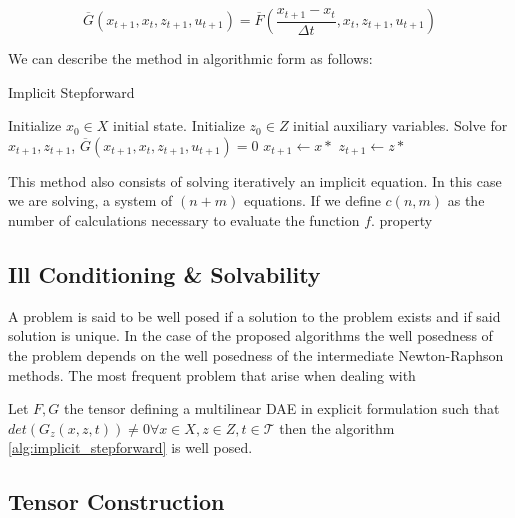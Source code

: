 \documentclass{article}
\newenvironment{remark}
\newenvironment{property}
\begin{document}
\begin{equation}
    \overline{G}(x_{t+1}, x_{t}, z_{t+1}, u_{t+1}) =  \overline{F}(\frac{x_{t+1}- x_t}{\Delta t}, x_{t}, z_{t+1}, u_{t+1})
\end{equation}

We can describe the method in algorithmic form as follows:

\begin{algorithm}
    \caption{Implicit Stepforward}
    \label{alg:implicit_stepforward}
    \begin{algorithmic}[1] %
        \State Initialize {$x_0 \in X$} initial state.
        \State Initialize {$z_0 \in Z$} initial auxiliary variables.
            \State Solve for $x_{t+1}, z_{t+1}$,  $\overline{G}(x_{t+1}, x_{t}, z_{t+1}, u_{t+1}) = 0$
            \State $x_{t+1} \gets x*$ 
            \State $z_{t+1} \gets z*$
        \EndFor
    \end{algorithmic}
\end{algorithm}

\begin{remark}
    This method also consists of solving iteratively an implicit equation. 
    In this case we are solving, a system of $(n+m)$ equations. If we define $c(n,m)$
    as the number of calculations necessary to evaluate the function $f$.    
\end{remark}

\subsection*{Ill Conditioning \& Solvability}

A problem is said to be well posed if a solution to the problem exists and if said solution is unique.
In the case of the proposed algorithms the well posedness of the problem depends
on the well posedness of the intermediate Newton-Raphson methods. 
The most frequent problem that arise when dealing with  

\begin{property}
    Let $F,G$ the tensor defining a multilinear DAE in explicit formulation such that
    $det(G_z(x,z,t)) \neq 0 \forall x \in X, z \in Z, t \in \mathcal{T}$
    then  the algorithm \ref{alg:implicit_stepforward} is well posed. 
\end{property}

\subsection{Tensor Construction}
\end{document}
